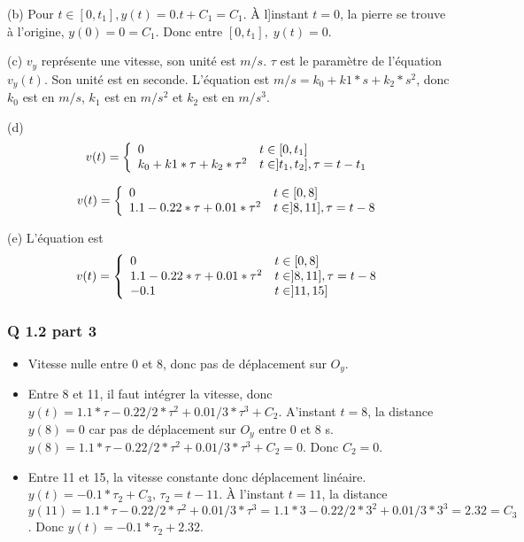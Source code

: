 \documentclass[]{book}
\theoremstyle{definition}
\begin{document}
(b) Pour $t \in [0,t_1], y(t) = 0.t+C_1=C_1$. \`A l]instant $t=0$, la pierre se trouve \`a l'origine, $y(0)= 0 = C_1$. Donc entre $[0,t_1], \; y(t) = 0$. 

(c) $v_y$ repr\'esente une vitesse, son unit\'e est $m/s$. $\tau$ est le param\`etre de 
l'\'equation $v_y(t)$. Son unit\'e est en seconde. L'\'equation est $m/s = k_0 + k1*s + k_2*s^2$, 
donc $k_0$ est en $m/s$, $k_1$ est en $m/s^2$ et $k_2$ est en $m/s^3$.

(d)
$$ v(t) =
\left\{ 
\begin{array}{l l}
0 &  t \in [0,t_1] \\
k_0 + k1*\tau + k_2*\tau^2  &  t \in ]t_1,t_2], \tau = t - t_1 \\
\end{array}
\right. 
$$

$$ v(t) =
\left\{ 
\begin{array}{l l}
0 &  t \in [0,8] \\
1.1 - 0.22*\tau + 0.01*\tau^2  &  t \in ]8,11], \tau = t-8 \\
\end{array}
\right. 
$$

(e) L'\'equation est
$$ v(t) =
\left\{ 
\begin{array}{l l}
0 &  t \in [0,8] \\
1.1 - 0.22*\tau + 0.01*\tau^2  &  t \in ]8,11], \tau = t-8 \\
-0.1  &  t \in ]11,15] \\
\end{array}
\right. 
$$

\subsubsection*{Q 1.2 part 3}
\begin{itemize}
\item Vitesse nulle entre 0 et 8, donc pas de d\'eplacement sur $O_y$.
\item Entre 8 et 11, il faut int\'egrer la vitesse, donc $y(t) = 1.1*\tau - 0.22/2*\tau^2 + 
0.01/3*\tau^3 + C_2$. A'instant $t=8$, la distance $y(8) = 0$ car pas de d\'eplacement 
sur $O_y$ entre 0 et 8 s. $y(8) = 1.1*\tau - 0.22/2*\tau^2 + 0.01/3*\tau^3 + C_2 = 0$. Donc $C_2 = 0$.
\item Entre 11 et 15, la vitesse constante donc d\'eplacement lin\'eaire. $y(t) = -0.1*\tau_2+C_3, \, \tau_2 = t-11$. \`A l'instant $t=11$, la distance $y(11) =  1.1*\tau - 0.22/2*\tau^2 + 0.01/3*\tau^3 = 1.1*3 - 0.22/2*3^2 + 0.01/3*3^3 = 2.32 =C_3$. Donc $y(t) = -0.1*\tau_2+2.32$.

\end{itemize}
\end{document}
